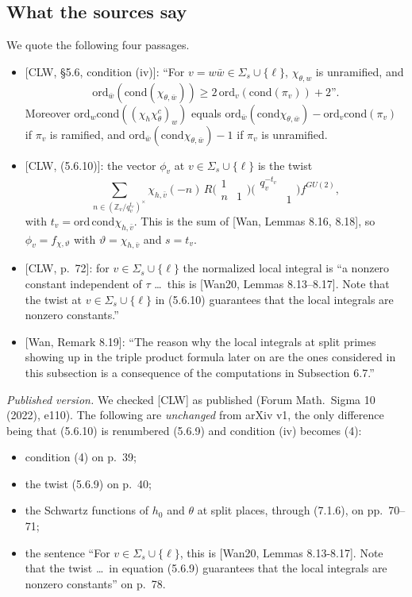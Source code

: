 \documentclass[11pt]{amsart}
\theoremstyle{definition}
\theoremstyle{remark}
\newcommand{\Z}{\mathbb{Z}}
\newcommand{\cond}{\mathrm{cond}}
\begin{document}
\subsection{What the sources say}
We quote the following four passages.
\begin{itemize}
\item {[CLW, \S 5.6, condition (iv)]}: ``For $v=w\bar w\in\Sigma_s\cup\{\ell\}$, $\chi_{\theta,w}$ is unramified, and
\[\mathrm{ord}_{\bar w}(\cond(\chi_{\theta,\bar w}))\ge 2\,\mathrm{ord}_v(\cond(\pi_v))+2\text{''}.\] Moreover $\mathrm{ord}_w\cond((\chi_h\chi_\theta^c)_w)$ equals $\mathrm{ord}_{\bar w}(\cond\chi_{\theta,\bar w})-\mathrm{ord}_v\cond(\pi_v)$ if $\pi_v$ is ramified, and $\mathrm{ord}_{\bar w}(\cond\chi_{\theta,\bar w})-1$ if $\pi_v$ is unramified.
\item {[CLW, (5.6.10)]}: the vector $\phi_v$ at $v\in\Sigma_s\cup\{\ell\}$ is the twist
\[\textstyle\sum_{n\in(\Z_v/q_v^{t_v})^\times}\chi_{h,\bar v}(-n)\,R\big(\begin{smallmatrix}1&\\n&1\end{smallmatrix}\big)\big(\begin{smallmatrix}q_v^{-t_v}&\\&1\end{smallmatrix}\big)f^{GU(2)},\]
with $t_v=\mathrm{ord}\,\cond\chi_{h,\bar v}$. This is the sum of [Wan, Lemmas 8.16, 8.18], so $\phi_v=f_{\chi,\vartheta}$ with $\vartheta=\chi_{h,\bar v}$ and $s=t_v$.
\item {[CLW, p.~72]}: for $v\in\Sigma_s\cup\{\ell\}$ the normalized local integral is ``a nonzero constant independent of $\tau$ \dots\ this is [Wan20, Lemmas 8.13--8.17]. Note that the twist at $v\in\Sigma_s\cup\{\ell\}$ in (5.6.10) guarantees that the local integrals are nonzero constants.''
\item {[Wan, Remark 8.19]}: ``The reason why the local integrals at split primes showing up in the triple product formula later on are the ones considered in this subsection is a consequence of the computations in Subsection 6.7.''
\end{itemize}

\emph{Published version.} We checked [CLW] as published (Forum Math.\ Sigma 10 (2022), e110). The following are \emph{unchanged} from arXiv v1, the only difference being that (5.6.10) is renumbered (5.6.9) and condition (iv) becomes (4):
\begin{itemize}
\item condition (4) on p.~39;
\item the twist (5.6.9) on p.~40;
\item the Schwartz functions of $h_0$ and $\theta$ at split places, through (7.1.6), on pp.~70--71;
\item the sentence ``For $v\in\Sigma_s\cup\{\ell\}$, this is [Wan20, Lemmas 8.13-8.17]. Note that the twist \dots\ in equation (5.6.9) guarantees that the local integrals are nonzero constants'' on p.~78.
\end{itemize}
\end{document}
